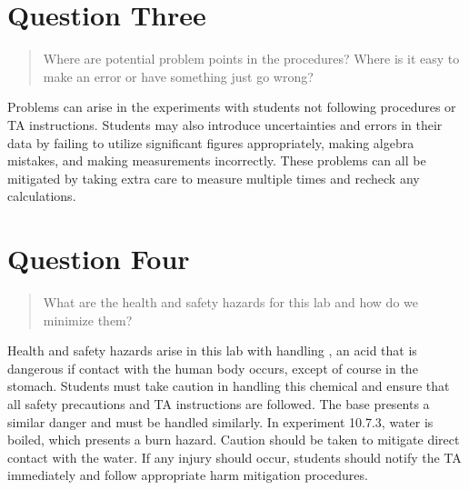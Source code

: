 \documentclass[11pt, letterpaper]{article}
\begin{document}
\section{Question Three}
\begin{quote}
    Where are potential problem points in the procedures? Where is it easy to make an error 
    or have something just go wrong?
\end{quote}
Problems can arise in the experiments with students not following procedures or TA instructions.
Students may also introduce uncertainties and errors in their data by failing to utilize
significant figures appropriately, making algebra mistakes, and making measurements incorrectly.
These problems can all be mitigated by taking extra care to measure multiple times and recheck
any calculations.

\section{Question Four}
\begin{quote}
    What are the health and safety hazards for this lab and how do we minimize them?
\end{quote}
Health and safety hazards arise in this lab with handling , an acid that is
dangerous if contact with the human body occurs, except of course in the stomach.
Students must take caution in handling this chemical and ensure that all safety 
precautions and TA instructions are followed.
The base  presents a similar danger and must be handled similarly.
In experiment 10.7.3, water is boiled, which presents a burn hazard.
Caution should be taken to mitigate direct contact with the water.
If any injury should occur, students should notify the TA immediately and 
follow appropriate harm mitigation procedures.
\end{document}
